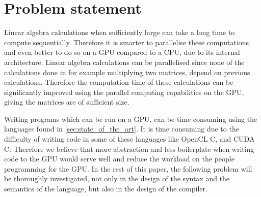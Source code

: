 \newpage
\section{Problem statement}

Linear algebra calculations when sufficiently large can take a long time to compute sequentially. 
Therefore it is smarter to parallelise these computations, and even better to do so on a GPU compared to a CPU, due to its internal architecture.
Linear algebra calculations can be parallelised since none of the calculations done in for example multiplying two matrices, depend on previous calculations.
Therefore the computation time of these calculations can be significantly improved using the parallel computing capabilities on the GPU, giving the matrices are of sufficient size.

Writing programs which can be run on a GPU, can be time consuming using the languages found in \ref{sec:state_of_the_art}.
It is time consuming due to the difficulty of writing code in some of these languages like OpenCL C, and CUDA C.
Therefore we believe that more abstraction and less boilerplate when writing code to the GPU would serve well and reduce the workload on the people programming for the GPU.
In the rest of this paper, the following problem will be thoroughly investigated, not only in the design of the syntax and the semantics of the language, but also in the design of the compiler.

